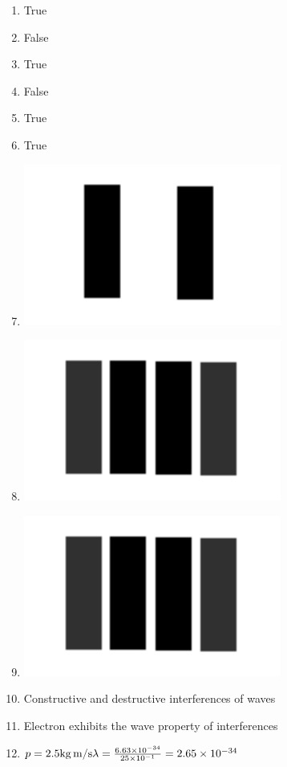 \documentclass[a4paper]{article}
\begin{document}
    \begin{enumerate}[1.]
        \item True
        \item False
        \item True
        \item False
        \item True
        \item True
        \item \includegraphics{1.jpeg}
        \item \includegraphics{2.jpeg}
        \item \includegraphics{2.jpeg}
        \item Constructive and destructive interferences of waves
        \item Electron exhibits the wave property of interferences
        \item $p = 2.5 \si[per-mode=symbol]{\kilogram\metre\per\second}\\ \lambda = \frac{\num{6.63d-34}}{\num{25d-1}} \\ =\num{2.65d-34}$

\end{enumerate}
\end{document}
